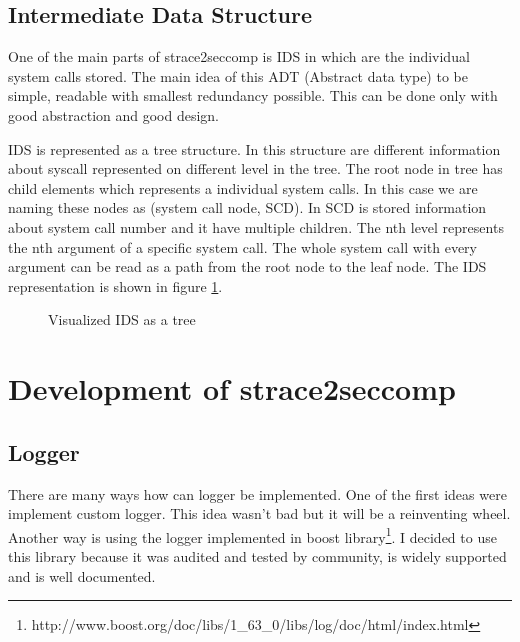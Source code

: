 \section{Intermediate Data Structure}
One of the main parts of strace2seccomp is IDS in which are the individual system calls stored.
The main idea of this ADT (Abstract data type) to be simple, readable with smallest redundancy possible.
This can be done only with good abstraction and good design.

IDS is represented as a tree structure.
In this structure are different information about syscall represented on different level in the tree.
The root node in tree has child elements which represents a individual system calls.
In this case we are naming these nodes as (system call node, SCD).
In SCD is stored information about system call number and it have multiple children.
The nth level represents the nth argument of a specific system call.
The whole system call with every argument can be read as a path from the root node to the leaf node.
The IDS representation is shown in figure \ref{fig:tikz:IDStree}.

\begin{figure}[h]
\centering
  \caption{Visualized IDS as a tree}
  \label{fig:tikz:IDStree}
\end{figure}

\chapter{Development of strace2seccomp}
\section{Logger}
There are many ways how can logger be implemented.
One of the first ideas were implement custom logger.
This idea wasn't bad but it will be a reinventing wheel.
Another way is using the logger implemented in boost library\footnote{http://www.boost.org/doc/libs/1\_63\_0/libs/log/doc/html/index.html}.
I decided to use this library because it was audited and tested by community, is widely supported and is well documented.
